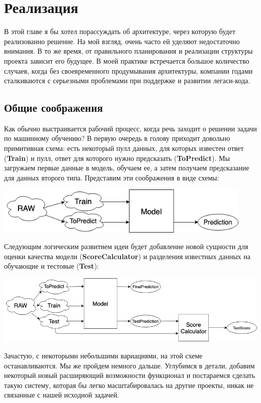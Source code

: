 \section{Реализация}

В этой главе я бы хотел порассуждать об архитектуре, через которую будет реализованно решение. На мой взгляд, очень часто ей уделяют недостаточно внимания. В то же время, от правильного планирования и реализации структуры проекта зависит его будущее. В моей практике встречается большое количество случаев, когда без своевременного продумывания архитектуры, компании годами сталкиваются с серьезными проблемами при поддержке и развитии легаси-кода.

\subsection{Общие соображения}
Как обычно выстраивается рабочий процесс, когда речь заходит о решении задачи по машинному обучению? В первую очередь в голову приходит довольно примитивная схема: есть некоторый пулл данных, для которых известен ответ (\textbf{Train}) и пулл, ответ для которого нужно предсказать (\textbf{ToPredict}). Мы загружаем первые данные в модель, обучаем ее, а затем получаем предсказание для данных второго типа. Представим эти соображения в виде схемы:

\begin{center} \includegraphics[width=350pt]{images/workflow_scheme_1}\end{center}

Следующим логическим развитием идеи будет добавление новой сущности для оценки качества модели (\textbf{ScoreCalculator}) и разделения известных данных на обучающие и тестовые (\textbf{Test}):


\begin{center} \includegraphics[width=450pt]{images/workflow_schema_2}\end{center}
Зачастую, с некоторыми небольшими вариациями, на этой схеме останавливаются. Мы же пройдем немного дальше.  Углубимся в детали, добавим некоторый новый расширяющий возможности функционал и постараемся сделать такую систему, которая бы легко масштабировалась на другие проекты, никак не связанные с нашей исходной задачей. 

